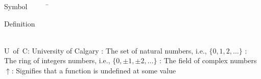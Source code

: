 


\begin{tabbing}
Symbol~~~~~\= \ \ \ \ \ \ \ \ \ \ \ \ \ \ \ \ \ \ \ \ \ \ \ \ \ \ \ \ \ \ \ \ \ \ \ \  \parbox{5in}{Definition}\\

\addsymbol \mbox{U of C}: {University of Calgary}
\addsymbol \mbox{\nat}: {The set of natural numbers, i.e., $\{0,1,2,\ldots\}$}
\addsymbol \mbox{\integers}: {The ring of integers numbers, i.e., $\{0,\pm1,\pm2,\ldots\}$}
\addsymbol \mbox{\complex}: {The field of complex numbers}
\addsymbol \mbox{$\uparrow$}: {Signifies that a function is undefined at some value}
\end{tabbing}
